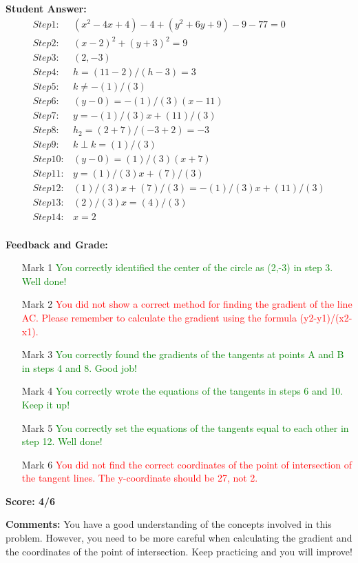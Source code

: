 \documentclass{article}
\begin{document}
\textbf{Student Answer:}
\begin{align*}
Step 1: & (x^{2}-4x+4)-4+(y^{2}+6y+9)-9-77=0 \\
Step 2: & (x-2)^{2}+(y+3)^{2}=9 \\
Step 3: & (2,-3) \\
Step 4: & h=(11-2)/(h-3)=3 \\
Step 5: & k\neq-(1)/(3) \\
Step 6: & (y-0)=-(1)/(3)(x-11) \\
Step 7: & y=-(1)/(3)x+(11)/(3) \\
Step 8: & h_2=(2+7)/(-3+2)=-3 \\
Step 9: & k \perp k=(1)/(3) \\
Step 10: & (y-0)=(1)/(3)(x+7) \\
Step 11: & y=(1)/(3)x+(7)/(3) \\
Step 12: & (1)/(3)x+(7)/(3)=-(1)/(3)x+(11)/(3) \\
Step 13: & (2)/(3)x=(4)/(3) \\
Step 14: & x=2 \\
\end{align*}

\textbf{Feedback and Grade:}
\begin{itemize}
\item[Mark 1] \textcolor{green}{You correctly identified the center of the circle as (2,-3) in step 3. Well done!}
\item[Mark 2] \textcolor{red}{You did not show a correct method for finding the gradient of the line AC. Please remember to calculate the gradient using the formula (y2-y1)/(x2-x1).}
\item[Mark 3] \textcolor{green}{You correctly found the gradients of the tangents at points A and B in steps 4 and 8. Good job!}
\item[Mark 4] \textcolor{green}{You correctly wrote the equations of the tangents in steps 6 and 10. Keep it up!}
\item[Mark 5] \textcolor{green}{You correctly set the equations of the tangents equal to each other in step 12. Well done!}
\item[Mark 6] \textcolor{red}{You did not find the correct coordinates of the point of intersection of the tangent lines. The y-coordinate should be 27, not 2.}
\end{itemize}

\textbf{Score: 4/6}

\textbf{Comments:} You have a good understanding of the concepts involved in this problem. However, you need to be more careful when calculating the gradient and the coordinates of the point of intersection. Keep practicing and you will improve!
\end{document}
